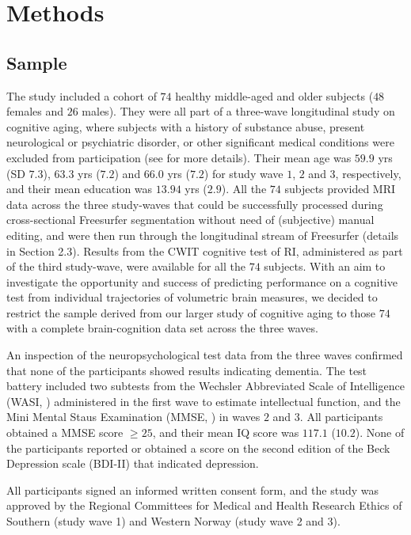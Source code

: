 \documentclass[10pt,letterpaper]{article}
\begin{document}
\section{Methods}

\subsection{Sample}
The study included a cohort of $74$ healthy middle-aged and older subjects ($48$ females and $26$ males). They were all part of a three-wave longitudinal study on cognitive aging, where subjects with a history of substance abuse, present neurological or psychiatric disorder, or other significant medical conditions were excluded from participation (see \cite{Espeseth2012, Lundervold2014} for more details). 
Their mean age was $59.9$ yrs (SD $7.3$), $63.3$ yrs ($7.2$) and $66.0$ yrs ($7.2$) for study wave $1$, $2$ and 
$3$, respectively, and their mean education was $13.94$ yrs ($2.9$). 
All the $74$ subjects provided MRI data across the three study-waves that could be successfully processed 
during cross-sectional Freesurfer segmentation without need of (subjective) manual editing, and were then run through the longitudinal stream of Freesurfer \cite{Dale1999} (details in Section 2.3). 
Results from the CWIT cognitive test of RI, administered as part of the third study-wave, were available for all the $74$ subjects. With an aim to investigate the opportunity and success of predicting  performance on a cognitive test from individual trajectories of volumetric brain measures, we decided to restrict the sample derived from our larger study of cognitive aging 
\cite{Espeseth2012, Lundervold2014} to those $74$ with a complete brain-cognition data set across the three waves. 


 An inspection of the neuropsychological test data from the three waves confirmed that none of the participants showed results indicating dementia. The test battery included two subtests from the Wechsler Abbreviated Scale of Intelligence (WASI, \cite{Wechsler1999}) administered in the first wave to estimate intellectual function, and the Mini Mental Staus Examination (MMSE, \cite{Folstein1975}) in waves $2$ and $3$.  All participants obtained a MMSE score  $\geq 25$, and their mean IQ score was $117.1$ ($10.2$). None of the participants reported or obtained a score on the second edition of the Beck Depression scale (BDI-II) \cite{Beck1987} that indicated depression. 

All participants signed an informed written consent form, and the study was approved by the Regional Committees for Medical and Health Research Ethics of Southern (study wave 1) and Western Norway (study wave 2 and 3).
\end{document}
